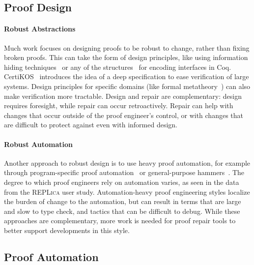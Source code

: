 \subsection{Proof Design}
\label{sec:design}


\paragraph{Robust Abstractions}
Much work focuses on designing proofs
to be robust to change, rather than fixing broken proofs.
This can take the form of design principles, like using 
information hiding techniques~\cite{Woos:2016:PCF:2854065.2854081, Klein:2014:CFV:2584468.2560537}
or any of the structures~\cite{Chrzaszcz2003, Sozeau2008, Saibi:PhD} for encoding interfaces in Coq.
CertiKOS~\cite{certikos} introduces the idea of a deep specification to ease verification of large systems.
Design principles for specific domains (like formal metatheory~\cite{Aydemir2008, Delaware2013POPL, Delaware2013ICFP})
can also make verification more tractable.
Design and repair are complementary: design requires foresight, while repair can occur retroactively.
Repair can help with changes that occur outside of the proof engineer's control,
or with changes that are difficult to protect against even with informed design.

\paragraph{Robust Automation}
Another approach to robust design is to use heavy proof automation, for example through
program-specific proof automation~\cite{Chlipala:2013:CPD:2584504}
or general-purpose hammers~\cite{Blanchette2016b, Blanchette2013, Kaliszyk2014, Czajka2018}.
The degree to which proof engineers rely on automation varies, as seen in the data from the \textsc{REPLica} user study. %
Automation-heavy proof engineering styles localize the burden of change to the automation,
but can result in terms that are large and slow to type check,
and tactics that can be difficult to debug.
While these approaches are complementary, more work is needed for proof repair tools to better support 
developments in this style.

\subsection{Proof Automation}
\label{sec:automation}

